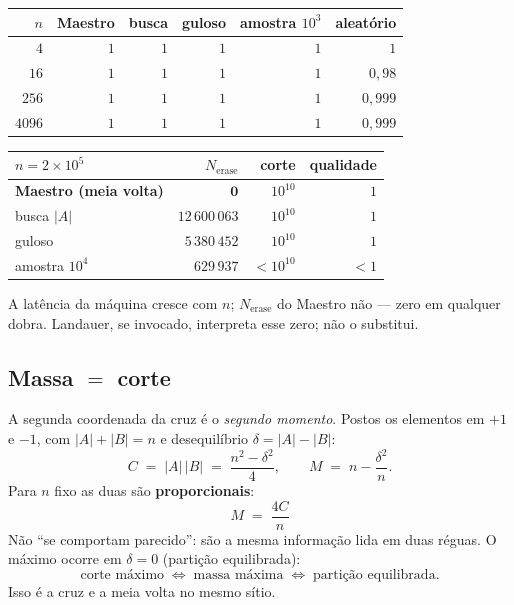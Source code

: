 \documentclass[11pt,a4paper]{article}
\begin{document}
\begin{center}\small
\begin{tabular}{@{}rrrrrr@{}}
\toprule
$n$ & Maestro & busca & guloso & amostra $10^{3}$ & aleatório \\
\midrule
$4$ & $1$ & $1$ & $1$ & $1$ & $1$ \\
$16$ & $1$ & $1$ & $1$ & $1$ & $0{,}98$ \\
$256$ & $1$ & $1$ & $1$ & $1$ & $0{,}999$ \\
$4096$ & $1$ & $1$ & $1$ & $1$ & $0{,}999$ \\
\bottomrule
\end{tabular}
\end{center}

\begin{center}\small
\begin{tabular}{@{}lrrr@{}}
\toprule
$n=2\times10^{5}$ & $N_{\mathrm{erase}}$ & corte & qualidade \\
\midrule
\textbf{Maestro (meia volta)} & $\mathbf{0}$ & $10^{10}$ & $1$ \\
busca $|A|$ & $12\,600\,063$ & $10^{10}$ & $1$ \\
guloso & $5\,380\,452$ & $10^{10}$ & $1$ \\
amostra $10^{4}$ & $629\,937$ & $<10^{10}$ & $<1$ \\
\bottomrule
\end{tabular}
\end{center}

\noindent A latência da máquina cresce com $n$; $N_{\mathrm{erase}}$ do Maestro não --- zero em
qualquer dobra. Landauer, se invocado, interpreta esse zero; não o substitui.

\subsection*{Massa $=$ corte}

A segunda coordenada da cruz é o \emph{segundo momento}. Postos os elementos em $+1$ e $-1$, com
$|A|+|B|=n$ e desequilíbrio $\delta=|A|-|B|$:
\[
  C \;=\; |A|\,|B| \;=\; \frac{n^{2}-\delta^{2}}{4},
  \qquad
  M \;=\; n - \frac{\delta^{2}}{n} .
\]
Para $n$ fixo as duas são \textbf{proporcionais}:
\[
  \boxed{\;M \;=\; \dfrac{4C}{n}\;}
\]
Não ``se comportam parecido'': são a mesma informação lida em duas réguas. O máximo ocorre em
$\delta=0$ (partição equilibrada):
\[
\boxed{
\text{corte máximo}
\;\Longleftrightarrow\;
\text{massa máxima}
\;\Longleftrightarrow\;
\text{partição equilibrada}.
}
\]
Isso é a cruz e a meia volta no mesmo sítio.
\end{document}

